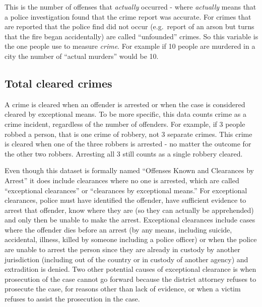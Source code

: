 \documentclass[
  12pt,
  openany]{book}
\begin{document}
This is the number of offenses that \emph{actually} occurred - where \emph{actually} means that a police investigation found that the crime report was accurate. For crimes that are reported that the police find did not occur (e.g.~report of an arson but turns that the fire began accidentally) are called ``unfounded'' crimes. So this variable is the one people use to measure \emph{crime}. For example if 10 people are murdered in a city the number of ``actual murders'' would be 10.

\hypertarget{total-cleared-crimes}{%
\subsection{Total cleared crimes}\label{total-cleared-crimes}}

A crime is cleared when an offender is arrested or when the case is considered cleared by exceptional means. To be more specific, this data counts crime as a crime incident, regardless of the number of offenders. For example, if 3 people robbed a person, that is one crime of robbery, not 3 separate crimes. This crime is cleared when one of the three robbers is arrested - no matter the outcome for the other two robbers. Arresting all 3 still counts as a single robbery cleared.

Even though this dataset is formally named ``Offenses Known and Clearances by Arrest'' it does include clearances where no one is arrested, which are called ``exceptional clearances'' or ``clearances by exceptional means.'' For exceptional clearances, police must have identified the offender, have sufficient evidence to arrest that offender, know where they are (so they can actually be apprehended) and only then be unable to make the arrest. Exceptional clearances include cases where the offender dies before an arrest (by any means, including suicide, accidental, illness, killed by someone including a police officer) or when the police are unable to arrest the person since they are already in custody by another jurisdiction (including out of the country or in custody of another agency) and extradition is denied. Two other potential causes of exceptional clearance is when prosecution of the case cannot go forward because the district attorney refuses to prosecute the case, for reasons other than lack of evidence, or when a victim refuses to assist the prosecution in the case.
\end{document}
